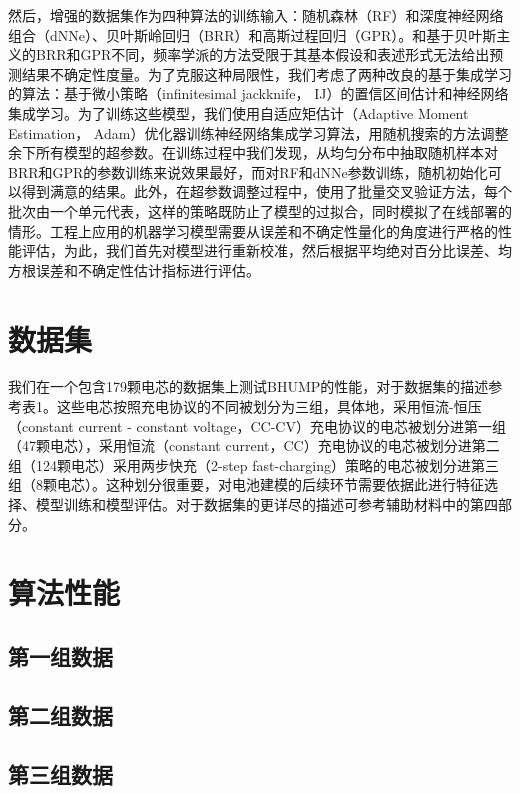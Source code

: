 \documentclass{article}
\begin{document}
然后，增强的数据集作为四种算法的训练输入：随机森林（RF）和深度神经网络组合（dNNe）、贝叶斯岭回归（BRR）和高斯过程回归（GPR）。和基于贝叶斯主义的BRR和GPR不同，频率学派的方法受限于其基本假设和表述形式无法给出预测结果不确定性度量。为了克服这种局限性，我们考虑了两种改良的基于集成学习的算法：基于微小策略（infinitesimal jackknife， IJ）的置信区间估计和神经网络集成学习。为了训练这些模型，我们使用自适应矩估计（Adaptive Moment Estimation， Adam）优化器训练神经网络集成学习算法，用随机搜索的方法调整余下所有模型的超参数。在训练过程中我们发现，从均匀分布中抽取随机样本对BRR和GPR的参数训练来说效果最好，而对RF和dNNe参数训练，随机初始化可以得到满意的结果。此外，在超参数调整过程中，使用了批量交叉验证方法，每个批次由一个单元代表，这样的策略既防止了模型的过拟合，同时模拟了在线部署的情形。工程上应用的机器学习模型需要从误差和不确定性量化的角度进行严格的性能评估，为此，我们首先对模型进行重新校准，然后根据平均绝对百分比误差、均方根误差和不确定性估计指标进行评估。

\section{数据集}

我们在一个包含179颗电芯的数据集上测试BHUMP的性能，对于数据集的描述参考表1。这些电芯按照充电协议的不同被划分为三组，具体地，采用恒流-恒压（constant current - constant voltage，CC-CV）充电协议的电芯被划分进第一组（47颗电芯），采用恒流（constant current，CC）充电协议的电芯被划分进第二组（124颗电芯）采用两步快充（2-step fast-charging）策略的电芯被划分进第三组（8颗电芯）。这种划分很重要，对电池建模的后续环节需要依据此进行特征选择、模型训练和模型评估。对于数据集的更详尽的描述可参考辅助材料中的第四部分。

\section{算法性能}

\subsection{第一组数据}

\subsection{第二组数据}

\subsection{第三组数据}
\end{document}

